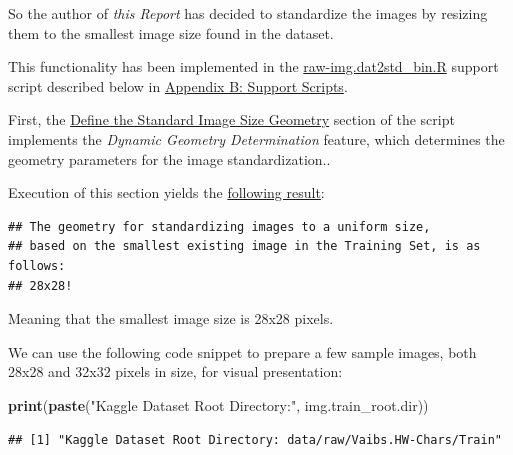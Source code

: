 \documentclass[
]{report}
\newenvironment{Shaded}{\begin{snugshade}}{\end{snugshade}}
\newcommand{\FunctionTok}[1]{\textcolor[rgb]{0.13,0.29,0.53}{\textbf{#1}}}
\newcommand{\NormalTok}[1]{#1}
\newcommand{\StringTok}[1]{\textcolor[rgb]{0.31,0.60,0.02}{#1}}
\begin{document}
So the author of \emph{this Report} has decided to standardize the images by resizing them to the smallest image size found in the dataset.

This functionality has been implemented in the \href{https://github.com/AzKurban-edX-DS/edx.capstone.choose-your-own/blob/main/r/support-scripts/raw-img.dat2std_bin.R}{raw-img.dat2std\_bin.R} support script described below in \hyperref[appndx_b]{Appendix B: Support Scripts}.

First, the \href{https://github.com/AzKurban-edX-DS/edx.capstone.choose-your-own/blob/main/r/support-scripts/raw-img.dat2std_bin.R\#L30-L73}{Define the Standard Image Size Geometry} section of the script implements the \emph{Dynamic Geometry Determination} feature, which determines the geometry parameters for the image standardization..

Execution of this section yields the \href{https://github.com/AzKurban-edX-DS/edx.capstone.choose-your-own/blob/main/r/support-scripts/raw-img.dat2std_bin.R\#L70}{following result}:

\begin{verbatim}
## The geometry for standardizing images to a uniform size, 
## based on the smallest existing image in the Training Set, is as follows: 
## 28x28!
\end{verbatim}

Meaning that the smallest image size is 28x28 pixels.

\newpage

We can use the following code snippet to prepare a few sample images, both 28x28 and 32x32 pixels in size, for visual presentation:

\begin{Shaded}
\begin{Highlighting}[]
\FunctionTok{print}\NormalTok{(}\FunctionTok{paste}\NormalTok{(}\StringTok{"Kaggle Dataset Root Directory:"}\NormalTok{, img.train\_root.dir))}
\end{Highlighting}
\end{Shaded}

\footnotesize

\begin{verbatim}
## [1] "Kaggle Dataset Root Directory: data/raw/Vaibs.HW-Chars/Train"
\end{verbatim}

\normalsize
\end{document}
